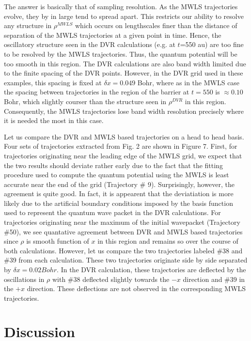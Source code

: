 The answer is basically that of sampling resolution.  As the MWLS 
trajectories evolve, they by in large tend to spread apart.  This 
restricts our ability to resolve any structure in $\rho^{MWLS}$ which 
occurs on lengthscales finer than the distance of separation of the 
MWLS trajectories at a given point in time.  Hence, the oscillatory 
structure seen in the DVR calculations (e.g. at $t$=550 au) are too 
fine to be resolved by the MWLS trajectories.  Thus, the quantum 
potential will be too smooth in this region.  The DVR calculations are 
also band width limited due to the finite spacing of the DVR points.  
However, in the DVR grid used in these examples, this spacing is fixed 
at $\delta x =0.049$ Bohr, where as in the MWLS case the spacing 
between trajectories in the region of the barrier at $t=550$ is 
$\approx 0.10$ Bohr, which slightly courser than the structure seen in 
$\rho^{DVR}$ in this region.  Consequently, the MWLS trajectories lose 
band width resolution precisely where it is needed the most in this 
case.



Let us compare the DVR and MWLS based trajectories on a head to head 
basis.  Four sets of trajectories extracted from Fig.  2 are shown in 
Figure 7.  First, for trajectories originating near the leading edge 
of the MWLS grid, we expect that the two results should deviate rather 
early due to the fact that the fitting procedure used to compute the 
quantum potential using the MWLS is least accurate near the end of the 
grid (Trajectory \#{} 9).  Surprisingly, however, the agreement is 
quite good.  In fact, it is appearent that the deviatiation is more 
likely due to the artificial boundary conditions imposed by the basis 
function used to represent the quantum wave packet in the DVR 
calculations.  For trajectories originating near the maximum of the 
initial wavepacket (Trajectory \#{}50), we see quantative agreement 
between DVR and MWLS based trajectories since $\rho $ is smooth 
function of $x$ in this region and remains so over the course of both 
calculations.  However, let us compare the two trajectories labeled 
\#{}38 and \#{}39 from each calculation.  These two trajectories 
originate side by side separated by $\delta x = 0.02 Bohr$.  In the 
DVR calculation, these trajectories are deflected by the oscillations 
in $\rho$ with \#{}38 deflected slightly towards the $-x$ direction 
and \#{}39 in the $+x$ direction.  These deflections are not observed 
in the corresponding MWLS trajectories.

\section{Discussion}

